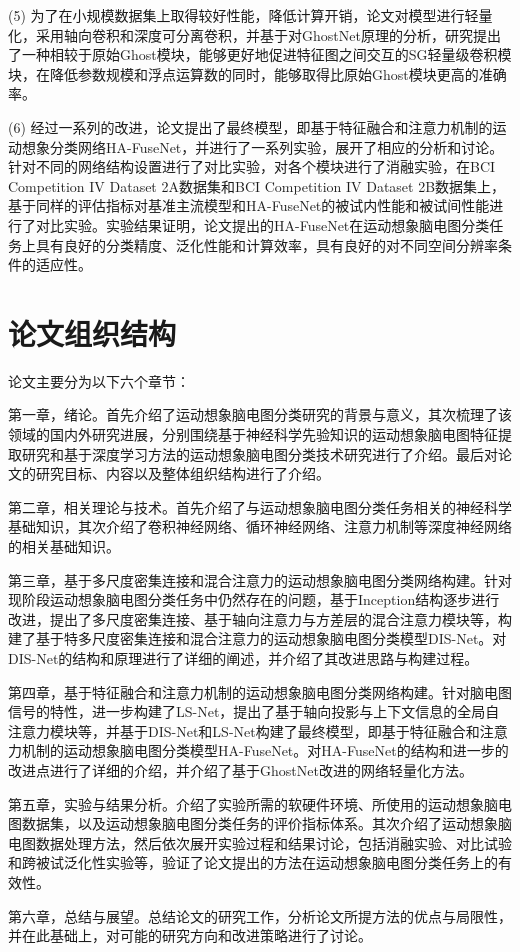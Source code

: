 (5) 为了在小规模数据集上取得较好性能，降低计算开销，论文对模型进行轻量化，采用轴向卷积和深度可分离卷积，并基于对GhostNet原理的分析，研究提出了一种相较于原始Ghost模块，能够更好地促进特征图之间交互的SG轻量级卷积模块，在降低参数规模和浮点运算数的同时，能够取得比原始Ghost模块更高的准确率。

(6) 经过一系列的改进，论文提出了最终模型，即基于特征融合和注意力机制的运动想象分类网络HA-FuseNet，并进行了一系列实验，展开了相应的分析和讨论。针对不同的网络结构设置进行了对比实验，对各个模块进行了消融实验，在BCI Competition IV Dataset 2A数据集和BCI Competition IV Dataset 2B数据集上，基于同样的评估指标对基准主流模型和HA-FuseNet的被试内性能和被试间性能进行了对比实验。实验结果证明，论文提出的HA-FuseNet在运动想象脑电图分类任务上具有良好的分类精度、泛化性能和计算效率，具有良好的对不同空间分辨率条件的适应性。

\section{论文组织结构}

论文主要分为以下六个章节：

第一章，绪论。首先介绍了运动想象脑电图分类研究的背景与意义，其次梳理了该领域的国内外研究进展，分别围绕基于神经科学先验知识的运动想象脑电图特征提取研究和基于深度学习方法的运动想象脑电图分类技术研究进行了介绍。最后对论文的研究目标、内容以及整体组织结构进行了介绍。

第二章，相关理论与技术。首先介绍了与运动想象脑电图分类任务相关的神经科学基础知识，其次介绍了卷积神经网络、循环神经网络、注意力机制等深度神经网络的相关基础知识。

第三章，基于多尺度密集连接和混合注意力的运动想象脑电图分类网络构建。针对现阶段运动想象脑电图分类任务中仍然存在的问题，基于Inception结构逐步进行改进，提出了多尺度密集连接、基于轴向注意力与方差层的混合注意力模块等，构建了基于特多尺度密集连接和混合注意力的运动想象脑电图分类模型DIS-Net。对DIS-Net的结构和原理进行了详细的阐述，并介绍了其改进思路与构建过程。

第四章，基于特征融合和注意力机制的运动想象脑电图分类网络构建。针对脑电图信号的特性，进一步构建了LS-Net，提出了基于轴向投影与上下文信息的全局自注意力模块等，并基于DIS-Net和LS-Net构建了最终模型，即基于特征融合和注意力机制的运动想象脑电图分类模型HA-FuseNet。对HA-FuseNet的结构和进一步的改进点进行了详细的介绍，并介绍了基于GhostNet改进的网络轻量化方法。

第五章，实验与结果分析。介绍了实验所需的软硬件环境、所使用的运动想象脑电图数据集，以及运动想象脑电图分类任务的评价指标体系。其次介绍了运动想象脑电图数据处理方法，然后依次展开实验过程和结果讨论，包括消融实验、对比试验和跨被试泛化性实验等，验证了论文提出的方法在运动想象脑电图分类任务上的有效性。

第六章，总结与展望。总结论文的研究工作，分析论文所提方法的优点与局限性，并在此基础上，对可能的研究方向和改进策略进行了讨论。